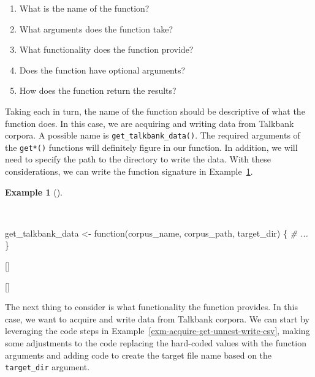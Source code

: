 \documentclass[
  letterpaper,
  krantz1]{latex/krantz-mod}
\newenvironment{Shaded}{\begin{snugshade}}{\end{snugshade}}
\newcommand{\CommentTok}[1]{\textcolor[rgb]{0.00,0.00,0.00}{\textit{#1}}}
\newcommand{\ControlFlowTok}[1]{\textcolor[rgb]{0.00,0.00,0.00}{#1}}
\newcommand{\NormalTok}[1]{\textcolor[rgb]{0.00,0.00,0.00}{#1}}
\newcommand{\OtherTok}[1]{\textcolor[rgb]{0.00,0.00,0.00}{#1}}
\providecommand{\tightlist}{%
  \setlength{\itemsep}{0pt}\setlength{\parskip}{0pt}}\usepackage{longtable,booktabs,array}
\newcommand{\cindex}[1]{%
  \StrSubstitute{#1}{_}{\_}[\temp]%
  \index{\temp}%
}
\theoremstyle{definition}
\theoremstyle{definition}
\newtheorem{example}{Example}[chapter]
\theoremstyle{remark}
\begin{document}
\begin{enumerate}
\def\labelenumi{\arabic{enumi}.}
\tightlist
\item
  What is the name of the function?
\item
  What arguments does the function take?
\item
  What functionality does the function provide?
\item
  Does the function have optional arguments?
\item
  How does the function return the results?
\end{enumerate}

Taking each in turn, the name of the function should be descriptive of
what the function does. In this case, we are acquiring and writing data
from Talkbank corpora. A possible name is
\texttt{get\_talkbank\_data()}. The required arguments of the
\texttt{get*()} functions will definitely figure in our function. In
addition, we will need to specify the path to the directory to write the
data. With these considerations, we can write the function signature in
Example~\ref{exm-acquire-get-talkbank-data-1}.

\pagebreak

\begin{example}[]\protect\hypertarget{exm-acquire-get-talkbank-data-1}{}\label{exm-acquire-get-talkbank-data-1}

~

\begin{Shaded}
\begin{Highlighting}[numbers=left,,]
\NormalTok{get\_talkbank\_data }\OtherTok{\textless{}{-}} \ControlFlowTok{function}\NormalTok{(corpus\_name, corpus\_path, target\_dir) \{}
  \CommentTok{\# ...}
\NormalTok{\}}
\end{Highlighting}
\end{Shaded}

\cindex{function()}
\cindex{get_talkbank_data()}

\end{example}

The next thing to consider is what functionality the function provides.
In this case, we want to acquire and write data from Talkbank corpora.
We can start by leveraging the code steps in
Example~\ref{exm-acquire-get-unnest-write-csv}, making some adjustments
to the code replacing the hard-coded values with the function arguments
and adding code to create the target file name based on the
\texttt{target\_dir} argument.
\end{document}
